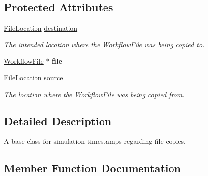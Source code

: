 \subsection*{Protected Attributes}
\begin{DoxyCompactItemize}
\item 
\mbox{\label{classwrench_1_1_simulation_timestamp_file_copy_af59ccf507af27b084a0618f3160efae1}} 
\hyperlink{structwrench_1_1_simulation_timestamp_file_copy_1_1_file_location}{File\+Location} \hyperlink{classwrench_1_1_simulation_timestamp_file_copy_af59ccf507af27b084a0618f3160efae1}{destination}
\begin{DoxyCompactList}\small\item\em The intended location where the \hyperlink{classwrench_1_1_workflow_file}{Workflow\+File} was being copied to. \end{DoxyCompactList}\item 
\mbox{\label{classwrench_1_1_simulation_timestamp_file_copy_aaf6fab52084bae83e672a8247acdf118}} 
\hyperlink{classwrench_1_1_workflow_file}{Workflow\+File} $\ast$ {\bfseries file}
\item 
\mbox{\label{classwrench_1_1_simulation_timestamp_file_copy_a62eeb6d5cc2e7103cc7b42478da660c7}} 
\hyperlink{structwrench_1_1_simulation_timestamp_file_copy_1_1_file_location}{File\+Location} \hyperlink{classwrench_1_1_simulation_timestamp_file_copy_a62eeb6d5cc2e7103cc7b42478da660c7}{source}
\begin{DoxyCompactList}\small\item\em The location where the \hyperlink{classwrench_1_1_workflow_file}{Workflow\+File} was being copied from. \end{DoxyCompactList}\end{DoxyCompactItemize}


\subsection{Detailed Description}
A base class for simulation timestamps regarding file copies. 

\subsection{Member Function Documentation}
\mbox{\label{classwrench_1_1_simulation_timestamp_file_copy_a18c0be71ae79818fe8d0300b08bb2238}} 
